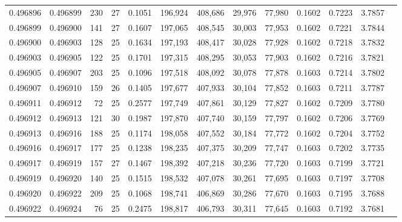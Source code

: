 \begin{tabular}{rrrrrrrrrrrrr}
0.496896 & 0.496899 & 230 &  27 &                                     0.1051 & 196,924 & 408,686 &  29,976 &  77,980 & 0.1602 & 0.7223 & 3.7857 \\
0.496899 & 0.496900 & 141 &  27 &                                     0.1607 & 197,065 & 408,545 &  30,003 &  77,953 & 0.1602 & 0.7221 & 3.7844 \\
0.496900 & 0.496903 & 128 &  25 &                                     0.1634 & 197,193 & 408,417 &  30,028 &  77,928 & 0.1602 & 0.7218 & 3.7832 \\
0.496903 & 0.496905 & 122 &  25 &                                     0.1701 & 197,315 & 408,295 &  30,053 &  77,903 & 0.1602 & 0.7216 & 3.7821 \\
0.496905 & 0.496907 & 203 &  25 &                                     0.1096 & 197,518 & 408,092 &  30,078 &  77,878 & 0.1603 & 0.7214 & 3.7802 \\
0.496907 & 0.496910 & 159 &  26 &                                     0.1405 & 197,677 & 407,933 &  30,104 &  77,852 & 0.1603 & 0.7211 & 3.7787 \\
0.496911 & 0.496912 &  72 &  25 &                                     0.2577 & 197,749 & 407,861 &  30,129 &  77,827 & 0.1602 & 0.7209 & 3.7780 \\
0.496912 & 0.496913 & 121 &  30 &                                     0.1987 & 197,870 & 407,740 &  30,159 &  77,797 & 0.1602 & 0.7206 & 3.7769 \\
0.496913 & 0.496916 & 188 &  25 &                                     0.1174 & 198,058 & 407,552 &  30,184 &  77,772 & 0.1602 & 0.7204 & 3.7752 \\
0.496916 & 0.496917 & 177 &  25 &                                     0.1238 & 198,235 & 407,375 &  30,209 &  77,747 & 0.1603 & 0.7202 & 3.7735 \\
0.496917 & 0.496919 & 157 &  27 &                                     0.1467 & 198,392 & 407,218 &  30,236 &  77,720 & 0.1603 & 0.7199 & 3.7721 \\
0.496919 & 0.496920 & 140 &  25 &                                     0.1515 & 198,532 & 407,078 &  30,261 &  77,695 & 0.1603 & 0.7197 & 3.7708 \\
0.496920 & 0.496922 & 209 &  25 &                                     0.1068 & 198,741 & 406,869 &  30,286 &  77,670 & 0.1603 & 0.7195 & 3.7688 \\
0.496922 & 0.496924 &  76 &  25 &                                     0.2475 & 198,817 & 406,793 &  30,311 &  77,645 & 0.1603 & 0.7192 & 3.7681 \\

\end{tabular}
